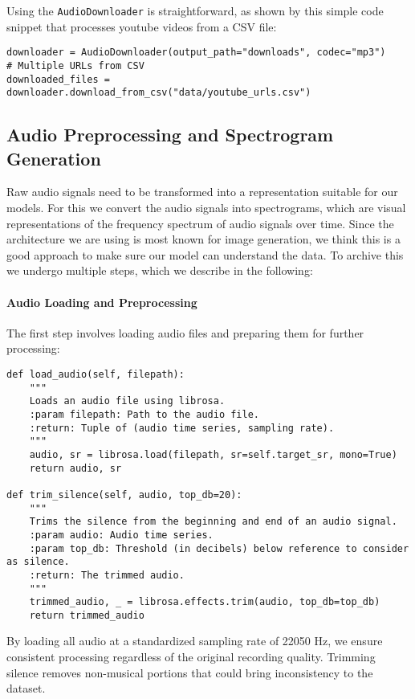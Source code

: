 Using the \texttt{AudioDownloader} is straightforward, as shown by this simple code snippet that processes youtube videos from a CSV file:

\begin{lstlisting}[caption=Example usage of AudioDownloader with CSV]
downloader = AudioDownloader(output_path="downloads", codec="mp3")
# Multiple URLs from CSV
downloaded_files = downloader.download_from_csv("data/youtube_urls.csv")
\end{lstlisting}

\subsection{Audio Preprocessing and Spectrogram Generation}

Raw audio signals need to be transformed into a representation suitable for our models.
For this we convert the audio signals into spectrograms, which are visual representations of the frequency spectrum of audio signals over time.
Since the architecture we are using is most known for image generation, we think this is a good approach to make sure our model can understand the data.
To archive this we undergo multiple steps, which we describe in the following:

\paragraph{Audio Loading and Preprocessing}
The first step involves loading audio files and preparing them for further processing:

\begin{lstlisting}[caption=Audio loading and silence trimming]
def load_audio(self, filepath):
    """
    Loads an audio file using librosa.
    :param filepath: Path to the audio file.
    :return: Tuple of (audio time series, sampling rate).
    """
    audio, sr = librosa.load(filepath, sr=self.target_sr, mono=True)
    return audio, sr

def trim_silence(self, audio, top_db=20):
    """
    Trims the silence from the beginning and end of an audio signal.
    :param audio: Audio time series.
    :param top_db: Threshold (in decibels) below reference to consider as silence.
    :return: The trimmed audio.
    """
    trimmed_audio, _ = librosa.effects.trim(audio, top_db=top_db)
    return trimmed_audio
\end{lstlisting}

By loading all audio at a standardized sampling rate of 22050 Hz, we ensure consistent processing regardless of the original recording quality. 
Trimming silence removes non-musical portions that could bring inconsistency to the dataset.

